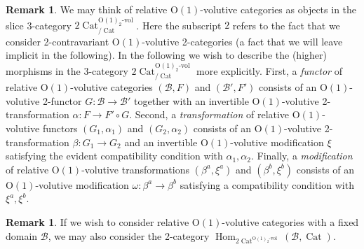 \documentclass{article}
\newcommand{\Cat}{\operatorname{Cat}}%
\newcommand{\Hom}{\operatorname{Hom}}%
\newcommand{\Oone}{\operatorname{O(1)}}
\newcommand{\B}{\mathcal{B}}
\numberwithin{equation}{section}
\theoremstyle{definition}
\newtheorem{remark}[definition]{Remark}
\theoremstyle{theorem}
\begin{document}
\begin{remark}
    We may think of relative $\Oone$-volutive categories as objects in the slice 3-category $2\Cat^{\Oone_2\text{-vol}}_{/\Cat}$. Here the subscript $2$ refers 
    to the fact that we consider 2-contravariant $\Oone$-volutive 2-categories (a fact that we will leave implicit in the following). In the following we wish to 
    describe the (higher) morphisms in the 3-category 
    $2\Cat^{\Oone_2\text{-vol}}_{/\Cat}$ more explicitly. First, a \emph{functor} of relative $\Oone$-volutive categories $(\B,F)$ and $(\B',F')$ consists of 
    an $\Oone$-volutive 2-functor $G \colon \B \to \B'$ together with an invertible $\Oone$-volutive 2-transformation $\alpha \colon F \to F' \circ G$. Second, 
    a \emph{transformation} of relative $\Oone$-volutive functors $(G_1,\alpha_1)$ and $(G_2,\alpha_2)$ consists of an $\Oone$-volutive 2-transformation $\beta \colon G_1 \to G_2$ 
    and an invertible $\Oone$-volutive modification $\xi$ satisfying the evident compatibility condition with $\alpha_1,\alpha_2$. Finally, a \emph{modification} of 
    relative $\Oone$-volutive transformations $(\beta^a,\xi^a)$ and $(\beta^b,\xi^b)$ consists of an $\Oone$-volutive modification $\omega \colon \beta^a \to \beta^b$
    satisfying a compatibility condition with $\xi^a,\xi^b$.
\end{remark}
\begin{remark}
    If we wish to consider relative $\Oone$-volutive categories with a fixed domain $\B$, we may also consider the 2-category 
    $\Hom_{2\Cat^{\Oone_2\text{-vol}}}(\B,\Cat)$.
\end{remark}
\end{document}
